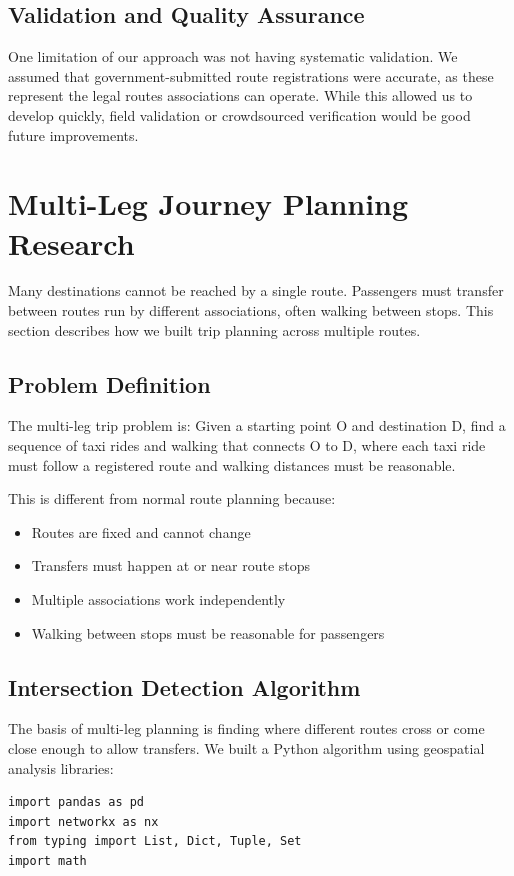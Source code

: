 \documentclass[a4paper,12pt]{article}
\begin{document}
\subsection{Validation and Quality Assurance}
One limitation of our approach was not having systematic validation. We assumed that government-submitted route registrations were accurate, as these represent the legal routes associations can operate. While this allowed us to develop quickly, field validation or crowdsourced verification would be good future improvements.

\section{Multi-Leg Journey Planning Research}
Many destinations cannot be reached by a single route. Passengers must transfer between routes run by different associations, often walking between stops. This section describes how we built trip planning across multiple routes.

\subsection{Problem Definition}
The multi-leg trip problem is: Given a starting point O and destination D, find a sequence of taxi rides and walking that connects O to D, where each taxi ride must follow a registered route and walking distances must be reasonable.

This is different from normal route planning because:
\begin{itemize}
\item Routes are fixed and cannot change
\item Transfers must happen at or near route stops
\item Multiple associations work independently
\item Walking between stops must be reasonable for passengers
\end{itemize}

\subsection{Intersection Detection Algorithm}
The basis of multi-leg planning is finding where different routes cross or come close enough to allow transfers. We built a Python algorithm using geospatial analysis libraries:

\begin{verbatim}
import pandas as pd
import networkx as nx
from typing import List, Dict, Tuple, Set
import math
\end{verbatim}
\end{document}
